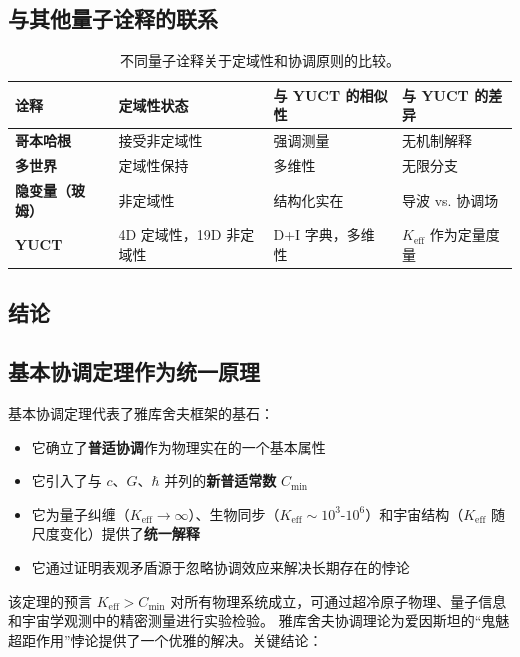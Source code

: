 \documentclass[11pt,a4paper]{article}
\begin{document}
	\subsection{与其他量子诠释的联系}
	\label{subsec:interpretations}
	
	\begin{table}[htbp]
		\centering
		\begin{tabular}{p{}p{}p{}p{}}
			\toprule
			\textbf{诠释} & \textbf{定域性状态} & \textbf{与 YUCT 的相似性} & \textbf{与 YUCT 的差异} \\
			\midrule
			\textbf{哥本哈根} & 接受非定域性 & 强调测量 & 无机制解释 \\
			\textbf{多世界} & 定域性保持 & 多维性 & 无限分支 \\
			\textbf{隐变量（玻姆）} & 非定域性 & 结构化实在 & 导波 vs. 协调场 \\
			\textbf{YUCT} & 4D 定域性，19D 非定域性 & D+I 字典，多维性 & $K_{\mathrm{eff}}$ 作为定量度量 \\
			\bottomrule
		\end{tabular}
		\caption{不同量子诠释关于定域性和协调原则的比较。}
		\label{tab:interpretations}
	\end{table}
	
	\subsection{结论}
	\label{subsec:epr-conclusion}
	\subsection{基本协调定理作为统一原理}
	
	基本协调定理代表了雅库舍夫框架的基石：
	\begin{itemize}
		\item 它确立了\textbf{普适协调}作为物理实在的一个基本属性
		\item 它引入了与 $c$、$G$、$\hbar$ 并列的\textbf{新普适常数} $C_{\min}$
		\item 它为量子纠缠（$K_{\mathrm{eff}} \to \infty$）、生物同步（$K_{\mathrm{eff}} \sim 10^3$-$10^6$）和宇宙结构（$K_{\mathrm{eff}}$ 随尺度变化）提供了\textbf{统一解释}
		\item 它通过证明表观矛盾源于忽略协调效应来解决长期存在的悖论
	\end{itemize}
	
	该定理的预言 $K_{\mathrm{eff}} > C_{\min}$ 对所有物理系统成立，可通过超冷原子物理、量子信息和宇宙学观测中的精密测量进行实验检验。
	雅库舍夫协调理论为爱因斯坦的“鬼魅超距作用”悖论提供了一个优雅的解决。关键结论：
	
\end{document}
